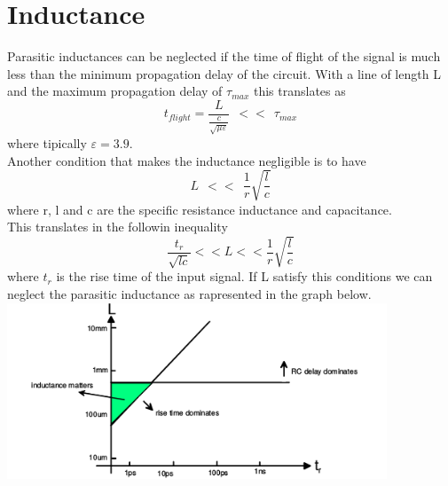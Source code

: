 \section{Inductance}

Parasitic inductances can be neglected if the time of flight of the signal is much less than the minimum propagation delay of the circuit. With a line of length L and the maximum propagation delay of $\tau_{max}$ this translates as 
\begin{equation}
t_{flight}=\frac{L}{\frac{c}{\sqrt{\mu \varepsilon}}}\ \  << \ \ \tau_{max}     
\end{equation}
where tipically $\varepsilon=3.9$.\\
\vspace{5mm}
Another condition that makes the inductance negligible is to have
\begin{equation}
L\ \ <<\ \ \frac{1}{r}\sqrt{\frac{l}{c}}
\end{equation}
where r, l and c are the specific resistance inductance and capacitance.\\
\vspace{5mm}
This translates in the followin inequality
\begin{equation}
\frac{t_r}{\sqrt{lc}}<<L<<\frac{1}{r}\sqrt{\frac{l}{c}}
\end{equation}
where $t_r$ is the rise time of the input signal. If L satisfy this conditions we can neglect the parasitic inductance as rapresented in the graph below.\\

\vspace{3mm}
\centering
\includegraphics[width=0.85\textwidth]{C5_10.png}\\
\raggedright


